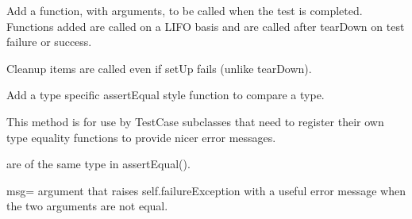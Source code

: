 \documentclass[letterpaper,10pt,english]{sphinxmanual}
\begin{document}
\begin{fulllineitems}
\begin{fulllineitems}
\end{fulllineitems}


\begin{fulllineitems}
\label{\detokenize{_autosummary/tests.test_unit.test_sqlite:tests.test_unit.test_sqlite.addCleanup}}
\pysigstartsignatures
{}
\pysigstopsignatures
\sphinxAtStartPar
Add a function, with arguments, to be called when the test is
completed. Functions added are called on a LIFO basis and are
called after tearDown on test failure or success.

\sphinxAtStartPar
Cleanup items are called even if setUp fails (unlike tearDown).

\end{fulllineitems}


\begin{fulllineitems}
\label{\detokenize{_autosummary/tests.test_unit.test_sqlite:tests.test_unit.test_sqlite.addTypeEqualityFunc}}
\pysigstartsignatures
{}
\pysigstopsignatures
\sphinxAtStartPar
Add a type specific assertEqual style function to compare a type.

\sphinxAtStartPar
This method is for use by TestCase subclasses that need to register
their own type equality functions to provide nicer error messages.
\begin{description}
\begin{description}
\sphinxAtStartPar
are of the same type in assertEqual().

\sphinxAtStartPar
msg= argument that raises self.failureException with a
useful error message when the two arguments are not equal.

\end{description}


\end{description}
\end{fulllineitems}
\end{fulllineitems}
\end{document}
